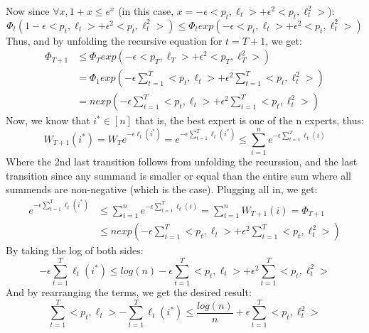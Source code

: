Now since $\forall x, 1 + x\leq e^x$ (in this case, $x = -\epsilon <p_t, \ell_t> + \epsilon^2 <p_t, \ell^2_t>$):
\begin{equation*}
    \Phi_t(1 - \epsilon <p_t, \ell_t> + \epsilon^2 <p_t, \ell^2_t>) 
    \leq \Phi_t exp(-\epsilon <p_t, \ell_t> + \epsilon^2 <p_t, \ell^2_t>)
\end{equation*}
Thus, and by unfolding the recursive equation for $t=T+1$, we get:
\begin{equation*}
    \begin{split}        
        \Phi_{T+1} &\leq \Phi_T exp(-\epsilon <p_T, \ell_T> + \epsilon^2 <p_T, \ell^2_T>) \\
        &= \Phi_1 exp(-\epsilon \sum_{t=1}^T<p_t, \ell_t> + \epsilon^2 \sum_{t=1}^T <p_t, \ell^2_t>)\\
        &= n exp(-\epsilon \sum_{t=1}^T<p_t, \ell_t> + \epsilon^2 \sum_{t=1}^T <p_t, \ell^2_t>)
    \end{split}
\end{equation*}
Now, we know that $i^*\in [n]$ that is, the best expert is one of the n experts, thus:
\begin{equation*}
    W_{T+1}(i^*) = W_T e^{-\epsilon \ell_t(i^*)} = e^{-\epsilon \sum_{t=1}^T\ell_t(i^*)} \leq \sum_{i=1}^n e^{-\epsilon \sum_{t=1}^T\ell_t(i)}
\end{equation*}
Where the 2nd last transition follows from unfolding the recurssion, and the last transition since any summand is smaller or equal than the entire sum where all summends are non-negative (which is the case).
Plugging all in, we get:
\begin{equation*}
    \begin{split}        
        e^{-\epsilon \sum_{t=1}^T\ell_t(i^*)} 
        &\leq \sum_{i=1}^n e^{-\epsilon \sum_{t=1}^T\ell_t(i)} = \sum_{i=1}^n W_{T+1}(i) = \Phi_{T+1} \\ 
        &\leq n exp(-\epsilon \sum_{t=1}^T<p_t, \ell_t> + \epsilon^2 \sum_{t=1}^T <p_t, \ell^2_t>)
    \end{split}
\end{equation*}
By taking the log of both sides:
\begin{equation*}
    -\epsilon \sum_{t=1}^T\ell_t(i^*) \leq log(n) -\epsilon \sum_{t=1}^T<p_t, \ell_t> + \epsilon^2 \sum_{t=1}^T <p_t, \ell^2_t>
\end{equation*}
And by rearranging the terms, we get the desired result:
\begin{equation*}
    \sum_{t=1}^T<p_t, \ell_t> - \sum_{t=1}^T\ell_t(i^*) \leq \frac{log(n)}{n} + \epsilon \sum_{t=1}^T <p_t, \ell^2_t>
\end{equation*}
